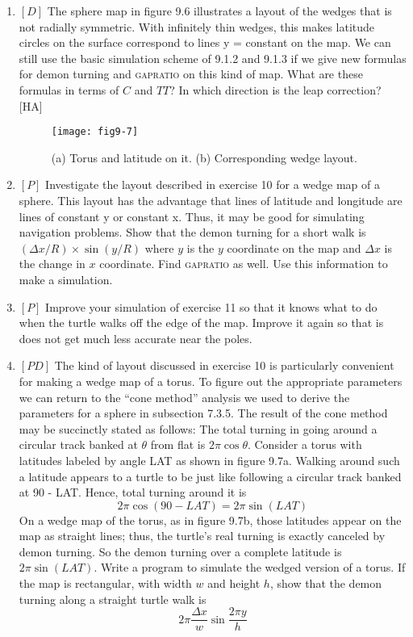 \documentclass{book}
\begin{document}
\begin{enumerate}
\item $[D]$ The sphere map in figure 9.6 illustrates a layout of the wedges
that is not radially symmetric. With infinitely thin wedges, this makes
latitude circles on the surface correspond to lines y = constant on the
map. We can still use the basic simulation scheme of 9.1.2 and 9.1.3 if
we give new formulas for demon turning and \textsc{gapratio} on this kind of
map. What are these formulas in terms of $C$ and $TT$? In which direction
is the leap correction? [HA]

\begin{figure}
\begin{center}
\texttt{[image: fig9-7]}
\caption{(a) Torus and latitude on it. (b) Corresponding wedge layout.}
\end{center}
\end{figure}

\item $[P]$ Investigate the layout described in exercise 10 for a wedge map
of a sphere. This layout has the advantage that lines of latitude and
longitude are lines of constant y or constant x. Thus, it may be good
for simulating navigation problems. Show that the demon turning for
a short walk is $(\Delta x / R) \times \sin (y / R)$ where $y$ is the $y$ coordinate on the
map and $ \Delta x $ is the change in $x$ coordinate. Find \textsc{gapratio} as well. Use
this information to make a simulation.

\item $[P]$ Improve your simulation of exercise 11 so that it knows what to
do when the turtle walks off the edge of the map. Improve it again so
that is does not get much less accurate near the poles.

\item $[PD]$ The kind of layout discussed in exercise 10 is particularly
convenient for making a wedge map of a torus. To figure out the
appropriate parameters we can return to the ``cone method'' analysis
we used to derive the parameters for a sphere in subsection 7.3.5. The
result of the cone method may be succinctly stated as follows: The total
turning in going around a circular track banked at $\theta$ from flat is $2 \pi \cos \theta $.
Consider a torus with latitudes labeled by angle LAT as shown in figure
9.7a. Walking around such a latitude appears to a turtle to be just like
following a circular track banked at 90 - LAT. Hence, total turning
around it is
$$2 \pi \cos (90 - LAT)= 2 \pi \sin (LAT)$$
On a wedge map of the torus, as in figure 9.7b, those latitudes appear
on the map as straight lines; thus, the turtle's real turning is exactly
canceled by demon turning. So the demon turning over a complete
latitude is $2 \pi \sin (LAT)$. Write a program to simulate the wedged version
of a torus. If the map is rectangular, with width $w$ and height $h$, show
that the demon turning along a straight turtle walk is
$$ 2 \pi \frac {\Delta x} {w} \sin \frac {2 \pi y} {h} $$


\end{enumerate}
\end{document}
